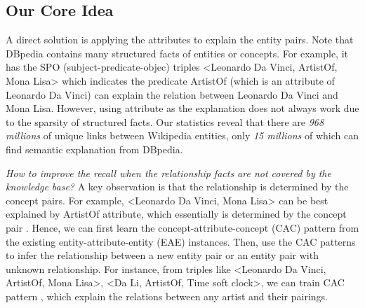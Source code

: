 \subsection{Our Core Idea}
A direct solution is applying the attributes to explain the entity pairs. 
Note that DBpedia contains many structured facts of entities or concepts.
For example, it has the SPO (subject-predicate-objec) triples \ac{<Leonardo Da Vinci, ArtistOf, Mona Lisa>} which indicates the predicate \ac{ArtistOf} (which is an attribute of \ac{Leonardo Da Vinci}) can explain the relation between \ac{Leonardo Da Vinci} and \ac{Mona Lisa}.
However, using attribute as the explanation does not always work due to the sparsity of structured facts. 
Our statistics reveal that there are \emph{968 millions} of unique links between Wikipedia entities, only \emph{15 millions} of which can find semantic explanation from DBpedia.


{\it How to improve the recall when the relationship facts are not covered by the knowledge base?} 
A key observation is that the relationship is determined by the concept pairs. For example, \ac{<Leonardo Da Vinci, Mona Lisa>} can be best explained by \ac{ArtistOf} attribute, which essentially is determined by the concept pair . Hence, we can first learn the concept-attribute-concept (CAC) pattern from the existing entity-attribute-entity (EAE) instances. Then, use the CAC patterns to infer the relationship between a new entity pair or an entity pair with unknown relationship.
For instance, from triples like \ac{<Leonardo Da Vinci, ArtistOf, Mona Lisa>}, \ac{<Da Li, ArtistOf, Time soft clock>}, we can train CAC pattern , which explain the  relations between any artist and their pairings.


